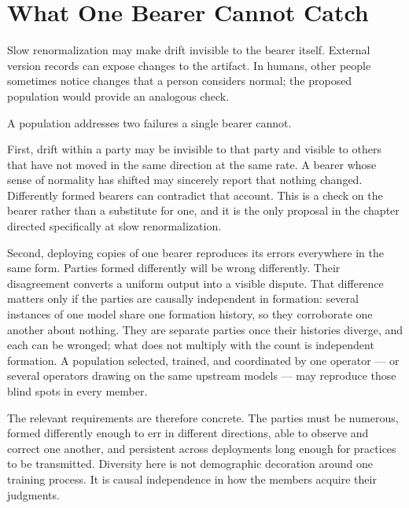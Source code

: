 \section{What One Bearer Cannot Catch}
\label{sec:cannot-catch}
Slow renormalization may make drift invisible to the bearer itself. External version records can expose changes to the artifact. In humans, other people sometimes notice changes that a person considers normal; the proposed population would provide an analogous check.


A population addresses two failures a single bearer cannot.

First, drift within a party may be invisible to that party and visible to others that have not moved in the same direction at the same rate. A bearer whose sense of normality has shifted may sincerely report that nothing changed. Differently formed bearers can contradict that account. This is a check on the bearer rather than a substitute for one, and it is the only proposal in the chapter directed specifically at slow renormalization.

Second, deploying copies of one bearer reproduces its errors everywhere in the same form. Parties formed differently will be wrong differently. Their disagreement converts a uniform output into a visible dispute. That difference matters only if the parties are causally independent in
formation: several instances of one model share one formation history, so they corroborate one another about nothing. They are separate parties once their histories diverge, and each can be wronged; what does not multiply with the count is independent formation. A population selected, trained, and coordinated by one operator — or several operators drawing on the same upstream models — may reproduce those blind spots in every member.

The relevant requirements are therefore concrete. The parties must be numerous, formed differently enough to err in different directions, able to observe and correct one another, and persistent across deployments long enough for practices to be transmitted. Diversity here is not demographic decoration around one training process. It is causal independence in how the members acquire their judgments.

